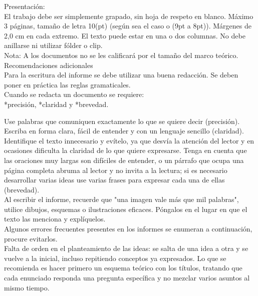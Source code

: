 

Presentación:\\

El trabajo debe ser simplemente grapado, sin hoja de respeto en blanco. Máximo 3 páginas, tamaño de letra 10(pt) (según sea el caso o (9pt a 8pt)). Márgenes de 2,0 cm en cada extremo. El texto puede estar en una o dos columnas. No debe anillarse ni utilizar fólder o clip.\\

Nota: A los documentos no se les calificará por el tamaño del marco teórico.\\

Recomendaciones adicionales\\

Para la escritura del informe se debe utilizar una buena redacción. Se deben poner en práctica las reglas gramaticales.\\

Cuando se redacta un documento se requiere:\\

*precisión,
*claridad y
*brevedad.

Use palabras que comuniquen exactamente lo que se quiere decir (precisión). Escriba en forma clara, fácil de entender y con un lenguaje sencillo (claridad). Identifique el texto innecesario y evítelo, ya que desvía la atención del lector y en ocasiones dificulta la claridad de lo que quiere expresarse. Tenga en cuenta que las oraciones muy largas son difíciles de entender, o un párrafo que ocupa una página completa abruma al lector y no invita a la lectura; si es necesario desarrollar varias ideas use varias frases para expresar cada una de ellas (brevedad).\\

Al escribir el informe, recuerde que "una imagen vale más que mil palabras", utilice dibujos, esquemas o ilustraciones eficaces. Póngalos en el lugar en que el texto las menciona y explíquelos.\\

Algunos errores frecuentes presentes en los informes se enumeran a continuación, procure evitarlos.\\

Falta de orden en el planteamiento de las ideas: se salta de una idea a otra y se vuelve a la inicial, incluso repitiendo conceptos ya expresados. Lo que se recomienda es hacer primero un esquema teórico con los títulos, tratando que cada enunciado responda una pregunta específica y no mezclar varios asuntos al mismo tiempo.\\

